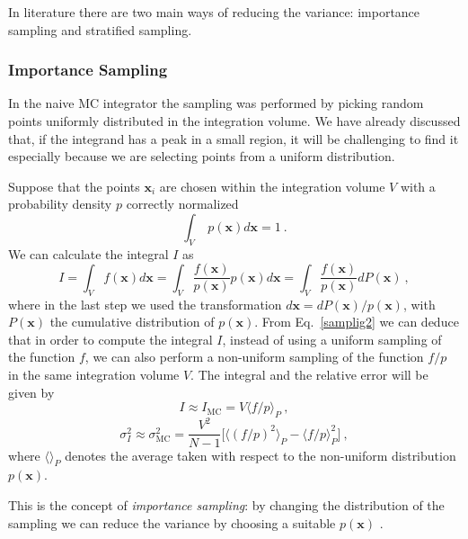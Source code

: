 \documentclass[../main/main.tex]{subfiles}
\begin{document}
In literature there are two main ways of reducing the variance: importance sampling and stratified sampling.

\subsubsection{Importance Sampling}
In the naive MC integrator the sampling was performed by picking random points uniformly distributed in the integration volume. 
We have already discussed that, if the integrand has a peak in a small region, it will be challenging to find it especially because we are selecting points from a uniform distribution. 

Suppose that the points $\textbf{x}_i$ are chosen within the integration volume $V$ with a probability density $p$ correctly normalized
\begin{equation}
	\label{normalization}
	\int_{V} \;  p(\textbf{x})  d \textbf{x}  = 1 \ .
\end{equation}
We can calculate the integral $I$ as
\begin{equation}
	\label{samplig2}
	I = \int_{V}   f(\textbf{x})  d \textbf{x}  =\int_{V}   \frac{f(\textbf{x})}{ p(\textbf{x})} p(\textbf{x})  d\textbf{x}
	= \int_{V}  \frac{f(\textbf{x})}{ p(\textbf{x})} dP(\textbf{x}) \ ,
\end{equation}
where in the last step we used the transformation $d\textbf{x} = dP(\textbf{x})/p(\textbf{x}) $, with $P(\textbf{x})$ the 
cumulative distribution of  $p(\textbf{x}) $.
\newline
From Eq.~\ref{samplig2} we can deduce that in order to compute the integral $I$, instead of using a uniform sampling of the function $f$,
we can also perform a non-uniform sampling of the function $f/p$ in the same integration volume $V$.
\newline
The integral and the relative error will be given by \cite{unknown}
\begin{equation}
	I \approx I_{\text{MC}}  = V \langle f/p \rangle_P \ ,
\end{equation}
\begin{equation}
	\label{sigma_IP}
	\sigma^2_I \approx \sigma^2_\text{MC} = \frac{V^2}{N-1} \bigg[\langle (f/p)^2 \rangle_P - \langle f/p \rangle^2_P \bigg] \ ,
\end{equation}
where $\langle \rangle_P$ denotes the average taken with respect to the non-uniform distribution $p(\textbf{x})$.

This is the concept of \emph{importance sampling}: by changing the distribution of the sampling we can reduce the variance by choosing
a suitable $p(\textbf{x})$ \cite{Lepage:2020tgj, Lepage:1977sw, unknown}.
\end{document}
